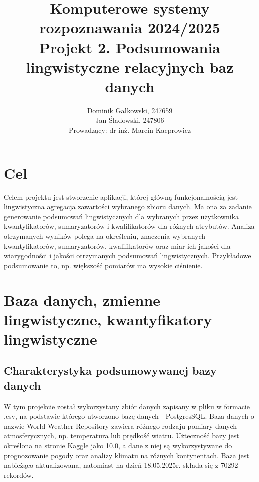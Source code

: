\documentclass{article}
\author{
	{Dominik Gałkowski, 247659} \\
	{Jan Śladowski, 247806}\\ 
{Prowadzący: dr inż. Marcin Kacprowicz}
}
\title{Komputerowe systemy rozpoznawania 2024/2025\\Projekt 2. Podsumowania lingwistyczne relacyjnych baz danych}
\begin{document}
\maketitle 

\section{Cel}
Celem projektu jest stworzenie aplikacji, której główną funkcjonalnością
jest lingwistyczna agregacja zawartości wybranego zbioru danych. Ma ona za zadanie generowanie podsumowań lingwistycznych dla wybranych przez użytkownika kwantyfikatorów, sumaryzatorów i kwalifikatorów dla różnych atrybutów. Analiza otrzymanych wyników polega na określeniu, znaczenia wybranych kwantyfikatorów, sumaryzatorów, kwalifikatorów oraz miar ich jakości dla wiarygodności i jakości otrzymanych podsumowań lingwistycznych. Przykładowe podsumowanie to, np. większość pomiarów ma wysokie ciśnienie.


\section{Baza danych, zmienne lingwistyczne, kwantyfikatory lingwistyczne}

\subsection{Charakterystyka podsumowywanej bazy danych}
W tym projekcie został wykorzystany zbiór danych zapisany w pliku w formacie .csv, na podstawie którego utworzono bazę danych - PostgresSQL. Baza danych o nazwie World Weather Repository zawiera różnego rodzaju pomiary danych atmosferycznych, np. temperatura lub prędkość wiatru. \cite{baza} Użteczność bazy jest określona na stronie Kaggle jako 10.0, a dane z niej są wykorzystywane do prognozowanie pogody oraz analizy klimatu na różnych kontynentach. Baza jest nabieżąco aktualizowana, natomiast na dzień 18.05.2025r. składa się z 70292 rekordów. 
\end{document}
